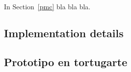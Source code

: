 In Section~\ref{pmc} bla bla bla.

\subsection{Implementation details}
\label{imple}

\subsection{Prototipo en tortugarte}
\label{tortugarte}


